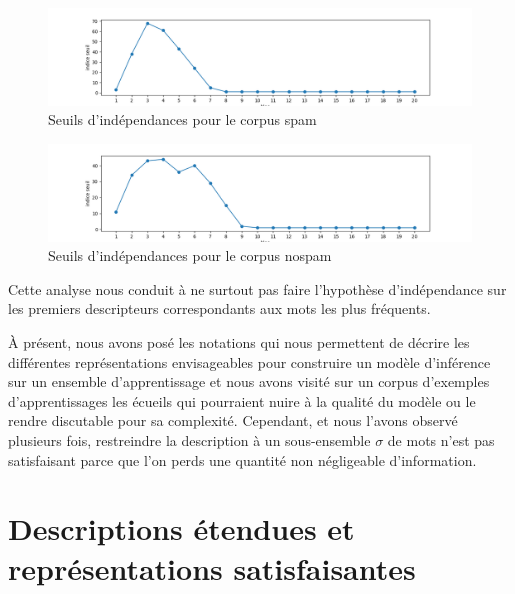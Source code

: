 \documentclass[a4paper, french]{article}
\begin{document}
\begin{figure}[h]
\begin{center}
    \caption{Seuils d'ind\'ependances pour le corpus spam}
    \label{fig:seuils_indes_spam}
    \includegraphics[width=15cm]{seuils_indes_nospam}
\end{center}
\end{figure}

\begin{figure}[h]
\begin{center}
    \caption{Seuils d'ind\'ependances pour le corpus nospam}
    \label{fig:seuils_indes_nospam}
    \includegraphics[width=15cm]{seuils_indes_spam}
\end{center}
\end{figure}

Cette analyse nous conduit \`a ne surtout pas faire l'hypoth\`ese 
d'ind\'ependance sur les premiers descripteurs correspondants aux mots
les plus fr\'equents.

\`A pr\'esent, nous avons pos\'e les notations qui nous permettent 
de d\'ecrire les diff\'erentes repr\'esentations envisageables pour
construire un mod\`ele d'inf\'erence sur un ensemble d'apprentissage 
et nous avons visit\'e sur un corpus d'exemples d'apprentissages les
\'ecueils qui pourraient nuire \`a la qualit\'e du mod\`ele ou le rendre
discutable pour sa complexit\'e. Cependant, et nous l'avons observ\'e
plusieurs fois, restreindre la description \`a un sous-ensemble $\sigma$
de mots n'est pas satisfaisant parce que l'on perds une quantit\'e non
n\'egligeable d'information.

\section{Descriptions \'etendues et repr\'esentations satisfaisantes}

\end{document}
